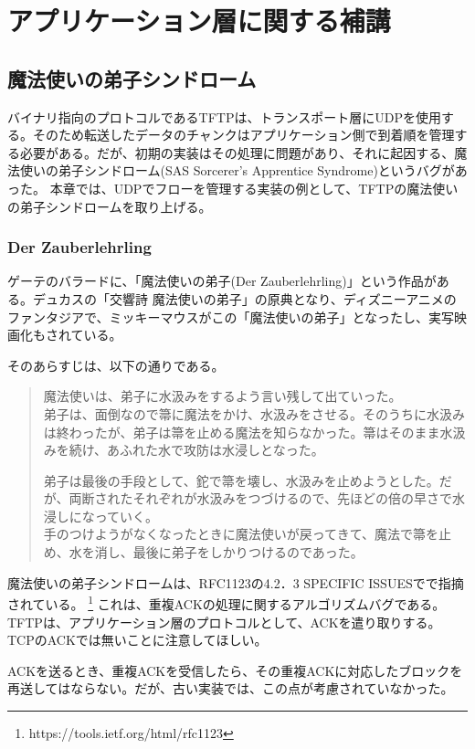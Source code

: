 \chapter{アプリケーション層に関する補講}

\section{魔法使いの弟子シンドローム}

バイナリ指向のプロトコルであるTFTPは、トランスポート層にUDPを使用する。そのため転送したデータのチャンクはアプリケーション側で到着順を管理する必要がある。だが、初期の実装はその処理に問題があり、それに起因する、魔法使いの弟子シンドローム(SAS Sorcerer's Apprentice Syndrome)というバグがあった。
本章では、UDPでフローを管理する実装の例として、TFTPの魔法使いの弟子シンドロームを取り上げる。

\subsection{Der Zauberlehrling}

ゲーテのバラードに、「魔法使いの弟子(Der Zauberlehrling)」という作品がある。デュカスの「交響詩 魔法使いの弟子」の原典となり、ディズニーアニメのファンタジアで、ミッキーマウスがこの「魔法使いの弟子」となったし、実写映画化もされている。

そのあらすじは、以下の通りである。

\begin{quotation}
魔法使いは、弟子に水汲みをするよう言い残して出ていった。
\\
弟子は、面倒なので箒に魔法をかけ、水汲みをさせる。そのうちに水汲みは終わったが、弟子は箒を止める魔法を知らなかった。箒はそのまま水汲みを続け、あふれた水で攻防は水浸しとなった。

弟子は最後の手段として、鉈で箒を壊し、水汲みを止めようとした。だが、両断されたそれぞれが水汲みをつづけるので、先ほどの倍の早さで水浸しになっていく。
\\
手のつけようがなくなったときに魔法使いが戻ってきて、魔法で箒を止め、水を消し、最後に弟子をしかりつけるのであった。
\end{quotation}

魔法使いの弟子シンドロームは、RFC1123の4.2．3 SPECIFIC ISSUESでで指摘されている。
\footnote{https://tools.ietf.org/html/rfc1123}
これは、重複ACKの処理に関するアルゴリズムバグである。
TFTPは、アプリケーション層のプロトコルとして、ACKを遣り取りする。TCPのACKでは無いことに注意してほしい。

ACKを送るとき、重複ACKを受信したら、その重複ACKに対応したブロックを再送してはならない。だが、古い実装では、この点が考慮されていなかった。

